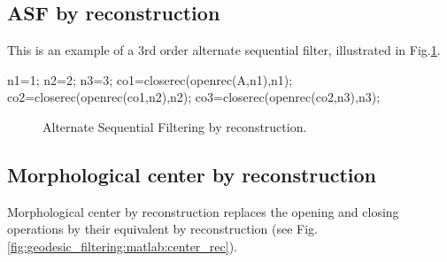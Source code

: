 \subsection{ASF by reconstruction}
This is an example of a 3rd order alternate sequential filter, illustrated in Fig.\ref{fig:geodesic_filtering:matlab:asf_rec}.

\begin{matlab}
n1=1;
n2=2;
n3=3;
co1=closerec(openrec(A,n1),n1);
co2=closerec(openrec(co1,n2),n2);
co3=closerec(openrec(co2,n3),n3);
\end{matlab}

\begin{figure}[htbp]
 \centering
 \hfill
 \hfill
 
 \caption{Alternate Sequential Filtering by reconstruction.}
 \label{fig:geodesic_filtering:matlab:asf_rec}
\end{figure}

\subsection{Morphological center by reconstruction}
Morphological center by reconstruction replaces the opening and closing operations by their equivalent by reconstruction (see Fig.\ref{fig:geodesic_filtering:matlab:center_rec}).

